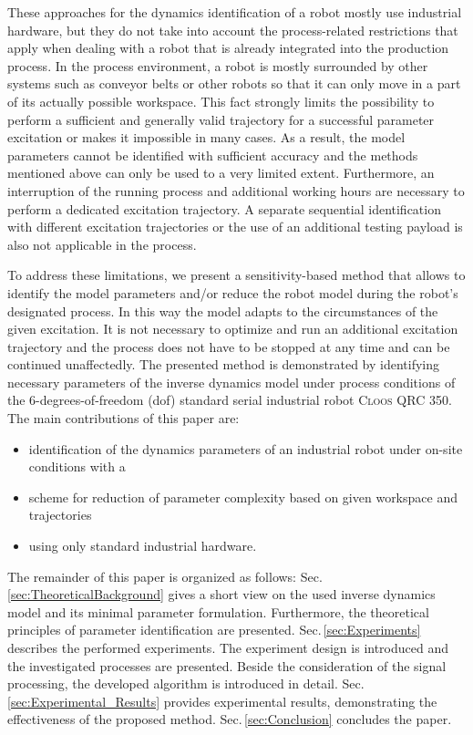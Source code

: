 These approaches for the dynamics identification of a robot mostly use industrial hardware, but they do not take into account the process-related restrictions that apply when dealing with a robot that is already integrated into the production process. 
In the process environment, a robot is mostly surrounded by other systems such as conveyor belts or other robots so that it can only move in a part of its actually possible workspace. This fact strongly limits the possibility to perform a sufficient and generally valid trajectory for a successful parameter excitation or makes it impossible in many cases. As a result, the model parameters cannot be identified with sufficient accuracy and the methods mentioned above can only be used to a very limited extent. 
Furthermore, an interruption of the running process and additional working hours are necessary to perform a dedicated excitation trajectory. 
A separate sequential identification with different excitation trajectories or the use of an additional testing payload is also not applicable in the process.

To address these limitations, we present a sensitivity-based method that allows to identify the model parameters and/or reduce the robot model during the robot's designated process. In this way the model adapts to the circumstances of the given excitation. It is not necessary to optimize and run an additional excitation trajectory and the process does not have to be stopped at any time and can be continued unaffectedly. 
The presented method is demonstrated by identifying necessary parameters of the inverse dynamics model under process conditions of the 6-degrees-of-freedom (dof) standard serial industrial robot \textsc{Cloos QRC 350}. 
The main contributions of this paper are:
\begin{itemize}
    \item identification of the dynamics parameters of an industrial robot under on-site conditions with a
    \item scheme for reduction of parameter complexity based on given workspace and trajectories
    \item using only standard industrial hardware.
\end{itemize}

The remainder of this paper is organized as follows: Sec.\,\ref{sec:TheoreticalBackground} gives a short view on the used inverse dynamics model and its minimal parameter formulation. Furthermore, the theoretical principles of parameter identification are presented. Sec.\,\ref{sec:Experiments} describes the performed experiments. 
The experiment design is introduced and the investigated processes are presented. 
Beside the consideration of the signal processing, the developed algorithm is introduced in detail.
Sec.\,\ref{sec:Experimental_Results} provides experimental results, demonstrating the effectiveness of the proposed method. Sec.\,\ref{sec:Conclusion} concludes the paper.

